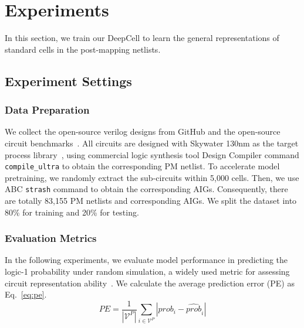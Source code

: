 \section{Experiments} \label{Sec:Experiment}
In this section, we train our DeepCell to learn the general representations of standard cells in the post-mapping netlists. 

\subsection{Experiment Settings}
\subsubsection{Data Preparation} 

We collect the open-source verilog designs from GitHub and the open-source circuit benchmarks~\cite{ISCAS89, ITC99, EPFLBenchmarks}. All circuits are designed with Skywater 130nm as the target process library~\cite{edwards2021introduction}, using commercial logic synthesis tool Design Compiler command \texttt{compile\_ultra} to obtain the corresponding PM netlist. To accelerate model pretraining, we randomly extract the sub-circuits within 5,000 cells. Then, we use ABC \texttt{strash} command to obtain the corresponding AIGs. Consequently, there are totally 83,155 PM netlists and corresponding AIGs. We split the dataset into 80\% for training and 20\% for testing. 

\subsubsection{Evaluation Metrics} In the following experiments, we evaluate model performance in predicting the logic-1 probability under random simulation, a widely used metric for assessing circuit representation ability~\cite{li2022deepgate, liu2024polargate}. We calculate the average prediction error (PE) as Eq.~\eqref{eq:pe}. 
\begin{equation} \label{eq:pe}
    PE = \frac{1}{|\mathcal{V}^P|}\sum_{i\in\mathcal{V}^P}|prob_i - \hat{prob}_{i}|
\end{equation}

